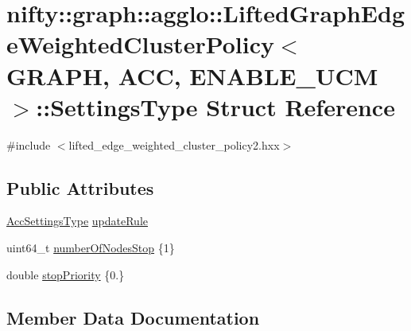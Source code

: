 \hypertarget{structnifty_1_1graph_1_1agglo_1_1LiftedGraphEdgeWeightedClusterPolicy_1_1SettingsType}{}\section{nifty\+:\+:graph\+:\+:agglo\+:\+:Lifted\+Graph\+Edge\+Weighted\+Cluster\+Policy$<$ G\+R\+A\+PH, A\+CC, E\+N\+A\+B\+L\+E\+\_\+\+U\+CM $>$\+:\+:Settings\+Type Struct Reference}
\label{structnifty_1_1graph_1_1agglo_1_1LiftedGraphEdgeWeightedClusterPolicy_1_1SettingsType}


{\ttfamily \#include $<$lifted\+\_\+edge\+\_\+weighted\+\_\+cluster\+\_\+policy2.\+hxx$>$}

\subsection*{Public Attributes}
\begin{DoxyCompactItemize}
\item 
\hyperlink{classnifty_1_1graph_1_1agglo_1_1LiftedGraphEdgeWeightedClusterPolicy_a988cf395d36cc7342860ae6b14977ae2}{Acc\+Settings\+Type} \hyperlink{structnifty_1_1graph_1_1agglo_1_1LiftedGraphEdgeWeightedClusterPolicy_1_1SettingsType_a119687c8c2269fd11e0799c9b84abfc3}{update\+Rule}
\item 
uint64\+\_\+t \hyperlink{structnifty_1_1graph_1_1agglo_1_1LiftedGraphEdgeWeightedClusterPolicy_1_1SettingsType_a49fe83e6225e58830d651157c52a6985}{number\+Of\+Nodes\+Stop} \{1\}
\item 
double \hyperlink{structnifty_1_1graph_1_1agglo_1_1LiftedGraphEdgeWeightedClusterPolicy_1_1SettingsType_a0fe7cd2e3b4196b5b4cf1e522bcb27f8}{stop\+Priority} \{0.\}
\end{DoxyCompactItemize}


\subsection{Member Data Documentation}
\mbox{\label{structnifty_1_1graph_1_1agglo_1_1LiftedGraphEdgeWeightedClusterPolicy_1_1SettingsType_a49fe83e6225e58830d651157c52a6985}} 
